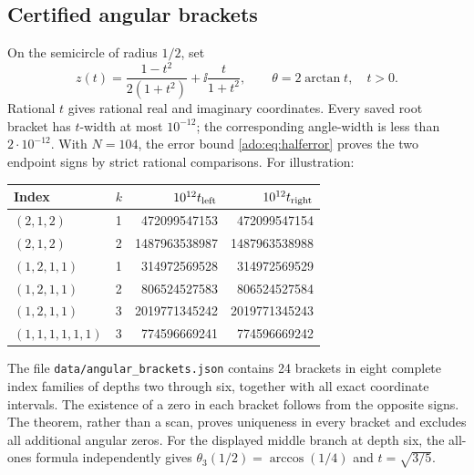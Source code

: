 \subsection{Certified angular brackets}
On the semicircle of radius $1/2$, set
\begin{equation}\label{ado:eq:rationalcircle}
 z(t)=\frac{1-t^2}{2(1+t^2)}+\ii\frac{t}{1+t^2},
 \qquad \theta=2\arctan t,\quad t>0.
\end{equation}
Rational $t$ gives rational real and imaginary coordinates. Every saved
root bracket has $t$-width at most $10^{-12}$; the corresponding
angle-width is less than $2\cdot10^{-12}$. With $N=104$, the
error bound \eqref{ado:eq:halferror} proves the two endpoint signs by
strict rational comparisons. For illustration:
\begin{center}\small
\begin{tabular}{@{}lcrr@{}}
\toprule
Index & $k$ & $10^{12}t_{\rm left}$ & $10^{12}t_{\rm right}$\\
\midrule
$(2,1,2)$ & 1 & 472099547153 & 472099547154\\
$(2,1,2)$ & 2 & 1487963538987 & 1487963538988\\
$(1,2,1,1)$ & 1 & 314972569528 & 314972569529\\
$(1,2,1,1)$ & 2 & 806524527583 & 806524527584\\
$(1,2,1,1)$ & 3 & 2019771345242 & 2019771345243\\
$(1,1,1,1,1,1)$ & 3 & 774596669241 & 774596669242\\
\bottomrule
\end{tabular}
\end{center}
The file \texttt{data/angular\_brackets.json} contains 24 brackets in
eight complete index families of depths two through six, together with
all exact coordinate intervals. The existence of a zero in each bracket
follows from the opposite signs. The theorem, rather than a scan,
proves uniqueness in every bracket and excludes all additional angular
zeros. For the displayed middle branch at depth six, the all-ones
formula independently gives
$\theta_3(1/2)=\arccos(1/4)$ and $t=\sqrt{3/5}$.


